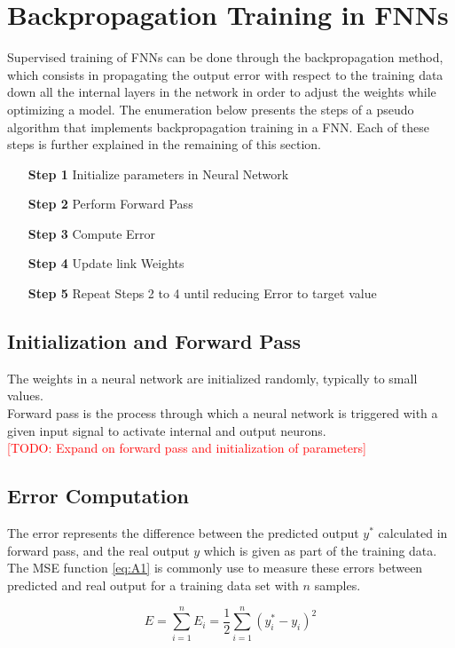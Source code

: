 \section{Backpropagation Training in FNNs}
Supervised training of FNNs can be done through the backpropagation method, which consists in propagating the output error with respect to the training data down all the internal layers in the network in order to adjust the weights while optimizing a model. The enumeration below presents the steps of a pseudo algorithm that implements backpropagation training in a FNN. Each of these steps is further explained in the remaining of this section.

	\begin{enumerate}\label{enum:A1}
	\item[\textbf{Step 1}] Initialize parameters in Neural Network
	\item[\textbf{Step 2}] Perform Forward Pass
	\item[\textbf{Step 3}] Compute Error
	\item[\textbf{Step 4}] Update link Weights
	\item[\textbf{Step 5}] Repeat Steps 2 to 4 until reducing Error to target value
	\end{enumerate}


\subsection{Initialization and Forward Pass}
The weights in a neural network are initialized randomly, typically to small values. 
\\
Forward pass is the process through which a neural network is triggered with a given input signal to activate internal and output neurons. 
\\
\textcolor{red} {[TODO: Expand on forward pass and initialization of parameters] }

\subsection{Error Computation}
The error represents the difference between the predicted output $y^*$ calculated in forward pass, and the real output $y$ which is given as part of the training data. The MSE function \ref{eq:A1} is commonly use to measure these errors between predicted and real output for a training data set with $n$ samples.

\begin{equation}\label{eq:A1}
E= \sum_{i=1}^{n} E_i =\frac{1}{2}\sum_{i=1}^{n}(y_i^* - y_i)^2
\end{equation}

